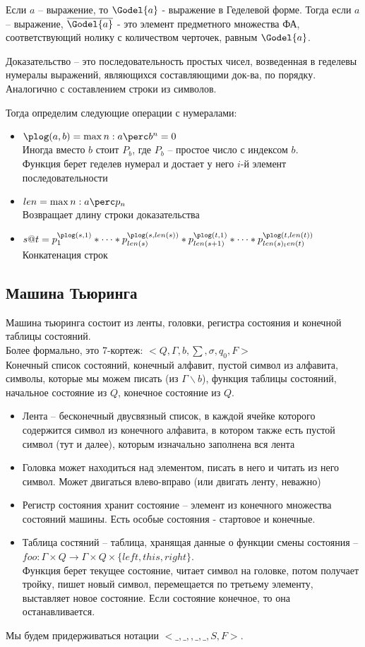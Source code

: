 Если $a$ -- выражение, то $\Godel{a}$ - выражение в Геделевой форме. Тогда если $a$ -- выражение, $\overline{\Godel{a}}$ - это элемент предметного множества ФА, соответствующий нолику с количеством черточек, равным $\Godel{a}$.

Доказательство -- это последовательность простых чисел, возведенная
в геделевы нумералы выражений, являющихся составляющими док-ва, по
порядку. Аналогично с составлением строки из символов.

Тогда определим следующие операции с нумералами:
\begin{itemize}
\item $\plog(a, b) = \max n : a \perc b^n = 0$\\
Иногда вместо $b$ стоит $P_{b}$, где $P_{b}$ -- простое число с индексом $b$.\\
Функция берет геделев нумерал и достает у него $i$-й элемент последовательности
\item $len = \max n : a \perc p_n$\\
Возвращает длину строки доказательства
\item $s@t = p_1^{\plog(s, 1)} * \dots  * p_{len(s)}^{\plog(s, len(s))} *
p_{len(s+1)}^{\plog(t, 1)} * \dots  * p_{len(s)_len(t)}^{\plog(t, len(t))}$\\
Конкатенация строк
\end{itemize}
\subsection{Машина Тьюринга}
\label{sec-12-3}
Машина тьюринга состоит из ленты, головки, регистра состояния и конечной таблицы состояний.\\
Более формально, это 7-кортеж: $<Q, \Gamma, b, \sum, \sigma, q_0, F>$\\
Конечный список состояний, конечный алфавит, пустой символ из алфавита, символы, которые мы можем писать (из $\Gamma \backslash b$), функция таблицы состояний, начальное состояние из $Q$, конечное состояние из $Q$.
\begin{itemize}
\item Лента -- бесконечный двусвязный список, в каждой ячейке которого содержится символ из конечного алфавита, в котором также есть пустой символ (тут и далее), которым изначально заполнена вся лента
\item Головка может находиться над элементом, писать в него и читать из него символ. Может двигаться влево-вправо (или двигать ленту, неважно)
\item Регистр состояния хранит состояние -- элемент из конечного множества состояний машины. Есть особые состояния - стартовое и конечные.
\item Таблица состяний -- таблица, хранящая данные о функции смены состояния -- $foo: \Gamma \times Q \to \Gamma \times Q \times \{left, this, right\}$.\\
Функция берет текущее состояние, читает символ на головке, потом получает тройку, пишет новый символ, перемещается по третьему элементу, выставляет новое состояние. Если состояние конечное, то она останавливается.
\end{itemize}
Мы будем придерживаться нотации $<\_, \_,  , \_, \_, S, F>$.
